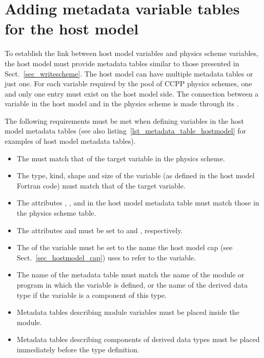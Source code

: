 \section{Adding metadata variable tables for the host model}
To establish the link between host model variables and physics scheme variables, the host model must provide metadata tables similar to those presented in Sect.~\ref{sec_writescheme}. The host model can have multiple metadata tables or just one. For each variable required by the pool of CCPP physics schemes, one and only one entry must exist on the host model side. The connection between a variable in the host model and in the physics scheme is made through its .

The following requirements must be met when defining variables in the host model metadata tables (see also listing~\ref{lst_metadata_table_hostmodel} for examples of host model metadata tables).
\begin{itemize}
\item The  must match that of the target variable in the physics scheme.
\item The type, kind, shape and size of the variable (as defined in the host model Fortran code) must match that of the target variable.
\item The attributes , ,  and  in the host model metadata table must match those in the physics scheme table.
\item The attributes  and  must be set to  and , respectively.
\item The  of the variable must be set to the name the host model cap (see Sect.~\ref{sec_hostmodel_cap}) uses to refer to the variable.
\item The name of the metadata table must match the name of the module or program in which the variable is defined, or the name of the derived data type if the variable is a component of this type.
\item Metadata tables describing module variables must be placed inside the module.
\item Metadata tables describing components of derived data types must be placed immediately before the type definition.
\end{itemize}
